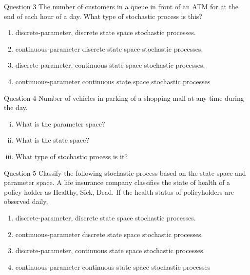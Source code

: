 \documentclass[12pt,ignorenonframetext,]{beamer}
\begin{document}
\begin{frame}{Question 3}
\protect\hypertarget{question-3}{}
The number of customers in a queue in front of an ATM for at the end of
each hour of a day. What type of stochastic process is this?

\begin{enumerate}
\item
  discrete-parameter, discrete state space stochastic processes.
\item
  continuous-parameter discrete state space stochastic processes.
\item
  discrete-parameter, continuous state space stochastic processes.
\item
  continuous-parameter continuous state space stochastic processes
\end{enumerate}
\end{frame}

\begin{frame}{Question 4}
\protect\hypertarget{question-4}{}
Number of vehicles in parking of a shopping mall at any time during the
day.

\begin{enumerate}
[i)]
\item
  What is the parameter space?
\item
  What is the state space?
\item
  What type of stochastic process is it?
\end{enumerate}
\end{frame}

\begin{frame}{Question 5}
\protect\hypertarget{question-5}{}
Classify the following stochastic process based on the state space and
parameter space. A life insurance company classifies the state of health
of a policy holder as Healthy, Sick, Dead. If the health status of
policyholders are observed daily,

\begin{enumerate}
\item
  discrete-parameter, discrete state space stochastic processes.
\item
  continuous-parameter discrete state space stochastic processes.
\item
  discrete-parameter, continuous state space stochastic processes.
\item
  continuous-parameter continuous state space stochastic processes
\end{enumerate}
\end{frame}
\end{document}
